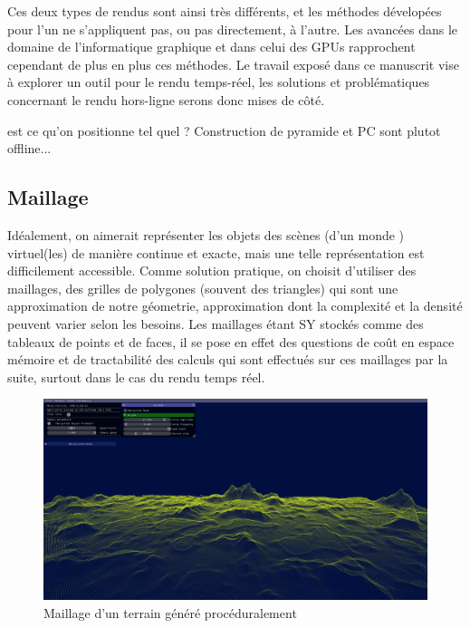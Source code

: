 Ces deux types de rendus sont ainsi très différents, et les méthodes dévelopées pour l'un ne s'appliquent pas, ou pas directement, à l'autre. Les avancées dans le domaine de l'informatique graphique et dans celui des GPUs rapprochent cependant de plus en plus ces méthodes. Le travail exposé dans ce manuscrit vise à explorer un outil pour le rendu temps-réel, les solutions et problématiques concernant le rendu hors-ligne serons donc mises de côté.

{\color{red}est ce qu'on positionne tel quel ? Construction de pyramide et PC sont plutot offline...}

\subsection*{Maillage}

Idéalement, on aimerait représenter les objets des scènes (d'un monde ) virtuel(les) de manière continue et exacte, mais une telle représentation est difficilement accessible. Comme solution pratique, on choisit d'utiliser des maillages, des grilles de polygones (souvent des triangles) qui sont une approximation de notre géometrie, approximation dont la complexité et la densité peuvent varier selon les besoins. Les maillages étant SY stockés comme des tableaux de points et de faces, il se pose en effet des questions de coût en espace mémoire et de tractabilité des calculs qui sont effectués sur ces maillages par la suite, surtout dans le cas du rendu temps réel.

\begin{figure}[h!]
    \centering
    \includegraphics[width=\textwidth]{contenu/resources/images/full_terrain}
    \caption{Maillage d'un terrain généré procéduralement}
    \label{fig:procedural-mesh}
\end{figure}


